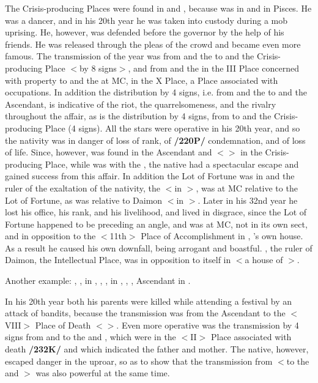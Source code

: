 The Crisis-producing Places were found in \Pisces\xspace and \Scorpio, because \Venus\xspace was in \Scorpio\xspace and \Mars in Pisces. He was a dancer, and in his 20th year he was taken into custody during a mob uprising. He, however, was defended before the governor by the help of his friends. He was released through the pleas of the crowd and became even more famous. The transmission of the year was from \Saturn\xspace and the \Moon\xspace to \Mars\xspace and the Crisis-producing Place $<$by 8 signs$>$, and from \Jupiter\xspace and the \Sun in the III Place concerned with property to \Saturn\xspace and the \Moon\xspace at MC, in the X Place, a Place associated with occupations. In addition the distribution by 4 signs, i.e. from \Saturn\xspace and the \Moon\xspace to \Venus\xspace and the Ascendant, is indicative of the riot, the quarrelsomeness, and the rivalry throughout the affair, as is the distribution by 4 signs, from \Mercury\xspace to \Mars\xspace and the Crisis-producing Place (4 signs). All the stars were operative in his 20th year, and so the nativity was in danger of loss of rank, of \textbf{/220P/} condemnation, and of loss of life. Since, however, \Venus\xspace was found in the Ascendant and $<$\Mars$>$ in the Crisis-producing Place, while \Jupiter\xspace was with the \Sun, the native had a spectacular escape and gained
success from this affair. In addition the Lot of Fortune was in \Aries\xspace and the ruler of the exaltation of the nativity, the \Sun $<$in \Capricorn$>$, was at MC relative to the Lot of Fortune, as was \Mars\xspace relative to Daimon $<$in \Gemini$>$. Later in his 32nd year he lost his office, his rank, and his livelihood, and lived in disgrace, since the Lot of Fortune happened to be preceding an angle, and \Saturn\xspace was at MC, not in its own sect, and in opposition to the $<$11th$>$ Place of Accomplishment in \Aquarius, \Saturn’s own house. As a result he caused his own downfall, being arrogant and boastful. \Mercury, the ruler of Daimon, the Intellectual Place, was in opposition to itself in \Gemini $<$a house of \Mercury$>$.

Another example: \Sun, \Moon, in \Cancer, \Saturn, \Jupiter, \Mars\xspace in \Aries, \Venus, \Mercury, Ascendant in \Gemini. 

In his 20th year both his parents were killed while attending a festival by an attack of bandits, because the transmission was from the Ascendant to the $<$VIII$>$ Place of Death $<$\Capricorn$>$. Even more operative was the transmission by 4 signs from \Saturn\xspace and \Mars\xspace to the \Sun\xspace and \Moon, which were in the
$<$II$>$ Place associated with death \textbf{/232K/} and which indicated the father and mother. The native, however, escaped danger in the uproar, so as to show that the transmission from \Jupiter\xspace $<$to the \Sun\xspace and \Moon$>$ was also powerful at the same time.
\newpage